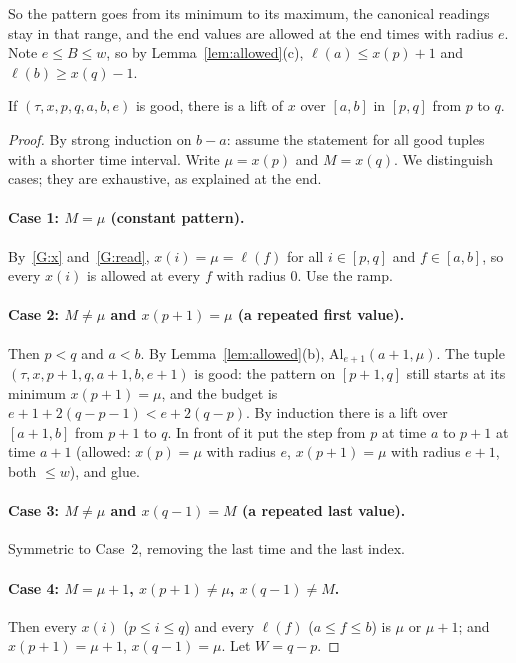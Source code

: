 So the pattern goes from its minimum to its maximum, the canonical readings stay in that range, and the end values
are allowed at the end times with radius $e$. Note $e\le B\le w$, so by Lemma~\ref{lem:allowed}(c),
$\ell(a)\le x(p)+1$ and $\ell(b)\ge x(q)-1$.


\begin{theorem}\label{thm:pf-main}
If $(\tau,x,p,q,a,b,e)$ is good, there is a lift of $x$ over $[a,b]$ in $[p,q]$ from $p$ to $q$.
\end{theorem}

\begin{proof}
By strong induction on $b-a$: assume the statement for all good tuples with a shorter time interval. Write
$\mu=x(p)$ and $M=x(q)$. We distinguish cases; they are exhaustive, as explained at the end.

\paragraph{Case 1: $M=\mu$ (constant pattern).} By~\ref{G:x} and~\ref{G:read}, $x(i)=\mu=\ell(f)$ for all $i\in[p,q]$
and $f\in[a,b]$, so every $x(i)$ is allowed at every $f$ with radius $0$. Use the ramp.

\paragraph{Case 2: $M\neq\mu$ and $x(p+1)=\mu$ (a repeated first value).} Then $p<q$ and $a<b$. By
Lemma~\ref{lem:allowed}(b), $\mathrm{Al}_{e+1}(a+1,\mu)$. The tuple $(\tau,x,p+1,q,a+1,b,e+1)$ is good: the pattern on
$[p+1,q]$ still starts at its minimum $x(p+1)=\mu$, and the budget is $e+1+2(q-p-1)<e+2(q-p)$. By induction there is a
lift over $[a+1,b]$ from $p+1$ to $q$. In front of it put the step from $p$ at time $a$ to $p+1$ at time $a+1$ (allowed:
$x(p)=\mu$ with radius $e$, $x(p+1)=\mu$ with radius $e+1$, both $\le w$), and glue.

\paragraph{Case 3: $M\neq\mu$ and $x(q-1)=M$ (a repeated last value).} Symmetric to Case~2, removing the last time and
the last index.

\paragraph{Case 4: $M=\mu+1$, $x(p+1)\neq\mu$, $x(q-1)\ne M$.} Then every $x(i)$ ($p\le i\le q$) and every $\ell(f)$
($a\le f\le b$) is $\mu$ or $\mu+1$; and $x(p+1)=\mu+1$, $x(q-1)=\mu$. Let $W=q-p$.


\end{proof}
